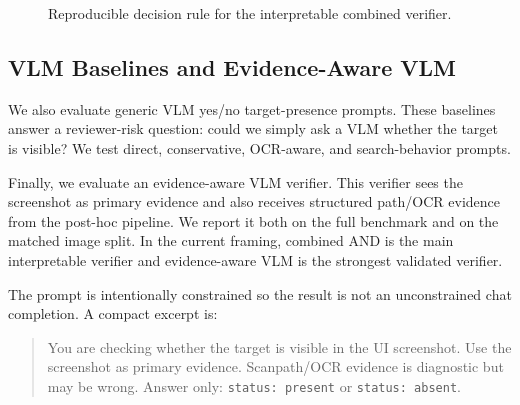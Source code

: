 \begin{figure}[t]
\small
{}
\caption{Reproducible decision rule for the interpretable combined verifier.}
\label{fig:combined_algorithm}
\end{figure}

\subsection{VLM Baselines and Evidence-Aware VLM}

We also evaluate generic VLM yes/no target-presence prompts. These baselines answer a reviewer-risk question: could we simply ask a VLM whether the target is visible? We test direct, conservative, OCR-aware, and search-behavior prompts.

Finally, we evaluate an evidence-aware VLM verifier. This verifier sees the screenshot as primary evidence and also receives structured path/OCR evidence from the post-hoc pipeline. We report it both on the full benchmark and on the matched image split. In the current framing, combined AND is the main interpretable verifier and evidence-aware VLM is the strongest validated verifier.

The prompt is intentionally constrained so the result is not an unconstrained chat completion. A compact excerpt is:

\begin{quote}
\small
You are checking whether the target is visible in the UI screenshot. Use the screenshot as primary evidence. Scanpath/OCR evidence is diagnostic but may be wrong. Answer only: \texttt{status: present} or \texttt{status: absent}.
\end{quote}

